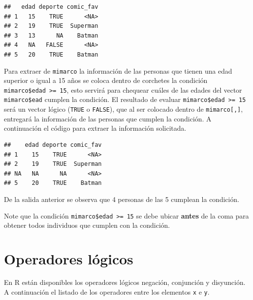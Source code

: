 \documentclass[
]{book}
\makeatletter
\newenvironment{Shaded}{\begin{snugshade}}{\end{snugshade}}
\newcommand{\DecValTok}[1]{\textcolor[rgb]{0.00,0.00,0.81}{#1}}
\newcommand{\NormalTok}[1]{#1}
\newcommand{\SpecialCharTok}[1]{\textcolor[rgb]{0.00,0.00,0.00}{#1}}
\newenvironment{kframe}{%
\medskip{}
\setlength{\fboxsep}{.8em}
 \def\at@end@of@kframe{}%
 \ifinner\ifhmode%
  \def\at@end@of@kframe{\end{minipage}}%
  \begin{minipage}{\columnwidth}%
 \fi\fi%
 \def\FrameCommand##1{\hskip\@totalleftmargin \hskip-\fboxsep
 \colorbox{shadecolor}{##1}\hskip-\fboxsep
     \hskip-\linewidth \hskip-\@totalleftmargin \hskip\columnwidth}%
 \MakeFramed {\advance\hsize-\width
   \@totalleftmargin\z@ \linewidth\hsize
   \@setminipage}}%
 {\par\unskip\endMakeFramed%
 \at@end@of@kframe}
\newenvironment{rmdblock}[1]
  {
  \begin{itemize}
  \renewcommand{\labelitemi}{
    \raisebox{-.7\height}[0pt][0pt]{
      {\setkeys{Gin}{width=3em,keepaspectratio}\texttt{[image: images/\#1]}}
    }
  }
  \setlength{\fboxsep}{1em}
  \begin{kframe}
  \item
  }
  {
  \end{kframe}
  \end{itemize}
  }
\newenvironment{rmdwarning}
  {\begin{rmdblock}{warning}}
  {\end{rmdblock}}
\makeatother
\begin{document}
\begin{verbatim}
##   edad deporte comic_fav
## 1   15    TRUE      <NA>
## 2   19    TRUE  Superman
## 3   13      NA    Batman
## 4   NA   FALSE      <NA>
## 5   20    TRUE    Batman
\end{verbatim}

Para extraer de \texttt{mimarco} la información de las personas que tienen una edad superior o igual a 15 años se coloca dentro de corchetes la condición \texttt{mimarco\$edad\ \textgreater{}=\ 15}, esto servirá para chequear cuáles de las edades del vector \texttt{mimarco\$ead} cumplen la condición. El resultado de evaluar \texttt{mimarco\$edad\ \textgreater{}=\ 15} será un vector lógico (\texttt{TRUE} o \texttt{FALSE}), que al ser colocado dentro de \texttt{mimarco{[},{]}}, entregará la información de las personas que cumplen la condición. A continuación el código para extraer la información solicitada.

\begin{Shaded}
\end{Shaded}

\begin{verbatim}
##    edad deporte comic_fav
## 1    15    TRUE      <NA>
## 2    19    TRUE  Superman
## NA   NA      NA      <NA>
## 5    20    TRUE    Batman
\end{verbatim}

De la salida anterior se observa que 4 personas de las 5 cumplean la condición.

\begin{rmdwarning}
Note que la condición \texttt{mimarco\$edad\ \textgreater{}=\ 15} se debe ubicar \textbf{antes} de la coma para obtener todos individuos que cumplen con la condición.
\end{rmdwarning}

\hypertarget{operadores-luxf3gicos}{%
\section{Operadores lógicos}\label{operadores-luxf3gicos}}

En R están disponibles los operadores lógicos negación, conjunción y disyunción. A continuación el listado de los operadores entre los elementos \texttt{x} e \texttt{y}.
\end{document}

